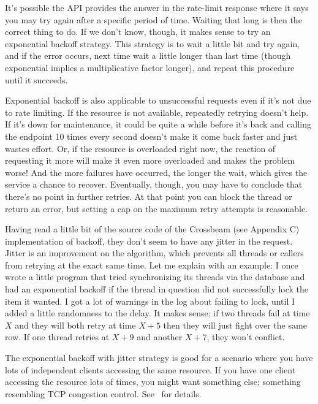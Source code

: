 It's possible the API provides the answer in the rate-limit response where it says you may try again after a specific period of time. Waiting that long is then the correct thing to do. If we don't know, though, it makes sense to try an exponential backoff strategy. This strategy is to wait a little bit and try again, and if the error occurs, next time wait a little longer than last time (though exponential implies a multiplicative factor longer), and repeat this procedure until it succeeds.

Exponential backoff is also applicable to unsuccessful requests even if it's not due to rate limiting. If the resource is not available, repeatedly retrying doesn't help. If it's down for maintenance, it could be quite a while before it's back and calling the endpoint 10 times every second doesn't make it come back faster and just wastes effort. Or, if the resource is overloaded right now, the reaction of requesting it more will make it even more overloaded and makes the problem worse! And the more failures have occurred, the longer the wait, which gives the service a chance to recover. Eventually, though, you may have to conclude that there's no point in further retries. At that point you can block the thread or return an error, but setting a cap on the maximum retry attempts is reasonable.

Having read a little bit of the source code of the Crossbeam (see Appendix C) implementation of backoff,  they don't seem to have any jitter in the request. Jitter is an improvement on the algorithm, which prevents all threads or callers from retrying at the exact same time. Let me explain with an example: I once wrote a little program that tried synchronizing its threads via the database and had an exponential backoff if the thread in question did not successfully lock the item it wanted. I got a lot of warnings in the log about failing to lock, until I added a little randomness to the delay. It makes sense; if two threads fail at time $X$ and they will both retry at time $X+5$ then they will just fight over the same row. If one thread retries at $X+9$ and another $X+7$, they won't conflict. %

The exponential backoff with jitter strategy is good for a scenario where you have lots of independent clients accessing the same resource. If you have one client accessing the resource lots of times, you might want something else; something resembling TCP congestion control. See~\cite{expbackoff} for details. 






